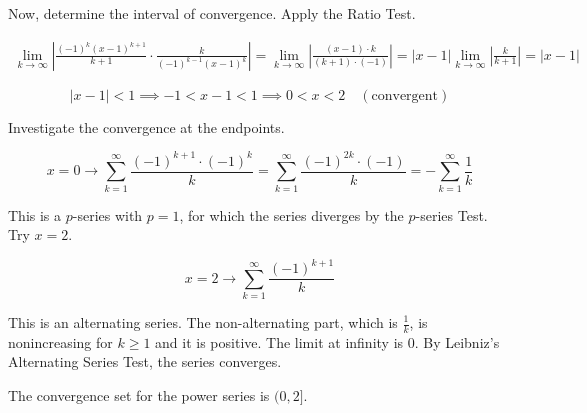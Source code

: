 \documentclass{article}
\begin{document}
\hfill

\noindent Now, determine the interval of convergence. Apply the Ratio Test.

\begin{align*}\lim_{k\to\infty}\left|\frac{(-1)^k(x-1)^{k+1}}{k+1}\cdot\frac{k}{(-1)^{k-1}(x-1)^k}\right|=\lim_{k\to\infty}\left|\frac{(x-1)\cdot k}{(k+1)\cdot(-1)}\right|=|x-1|\lim_{k\to\infty}\left|\frac k{k+1}\right|=|x-1|\end{align*}

\[|x-1|<1\implies-1<x-1<1\implies0<x<2\quad(\text{convergent})\]

\hfill

\noindent Investigate the convergence at the endpoints.

\[x=0\rightarrow\sum_{k=1}^{\infty}\frac{(-1)^{k+1}\cdot(-1)^k}{k}=\sum_{k=1}^{\infty}\frac{(-1)^{2k}\cdot(-1)}{k}=-\sum_{k=1}^{\infty}\frac{1}{k}\]

\hfill

\noindent This is a $p$-series with $p=1$, for which the series diverges by the $p$-series Test. Try $x=2$.

\[x=2\rightarrow\sum_{k=1}^{\infty}\frac{(-1)^{k+1}}{k}\]

\hfill

\noindent This is an alternating series. The non-alternating part, which is $\frac1k$, is nonincreasing for $k\geq1$ and it is positive. The limit at infinity is $0$. By Leibniz's Alternating Series Test, the series converges.

\hfill

\noindent The convergence set for the power series is $\boxed{(0,2]}$.
\end{document}

